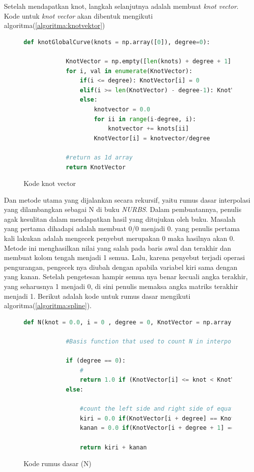 Setelah mendapatkan knot, langkah selanjutnya 
adalah membuat \textit{knot vector}. Kode untuk 
\textit{knot vector} akan dibentuk mengikuti 
algoritma(\ref{algoritma:knotvektor})
\begin{figure}[H]
	\centering
	\begin{lstlisting}[language=Python, basicstyle=\tiny]
		def knotGlobalCurve(knots = np.array([0]), degree=0):

			KnotVector = np.empty([len(knots) + degree + 1])
			for i, val in enumerate(KnotVector):
				if(i <= degree): KnotVector[i] = 0 
				elif(i >= len(KnotVector) - degree-1): KnotVector[i] = 1
				else:
					knotvector = 0.0
					for ii in range(i-degree, i):
						knotvector += knots[ii]
					KnotVector[i] = knotvector/degree

			#return as 1d array
			return KnotVector
	\end{lstlisting}
	\caption{Kode knot vector}
	\label{kode:knotvector}
\end{figure}

Dan metode utama yang dijalankan secara rekursif, 
yaitu rumus dasar interpolasi yang dilambangkan 
sebagai N di buku \textit{NURBS}. Dalam pembuatannya, 
penulis agak kesulitan dalam mendapatkan hasil yang 
ditujukan oleh buku. Masalah yang pertama dihadapi 
adalah membuat 0/0 menjadi 0. yang penulis pertama 
kali lakukan adalah mengecek penyebut merupakan 0 maka 
hasilnya akan 0. Metode ini menghasilkan nilai yang salah 
pada baris awal dan terakhir dan membuat kolom tengah 
menjadi 1 semua. Lalu, karena penyebut terjadi operasi 
pengurangan, pengecek nya diubah dengan apabila variabel 
kiri sama dengan yang kanan. Setelah pengetesan hampir 
semua nya benar kecuali angka terakhir, yang seharusnya 1 
menjadi 0, di sini penulis memaksa angka matriks terakhir 
menjadi 1. Berikut adalah kode untuk rumus dasar mengikuti
algoritma(\ref{algoritma:spline}).
\begin{figure}[H]
	\centering
	\begin{lstlisting}[language=Python, basicstyle=\tiny]
		def N(knot = 0.0, i = 0 , degree = 0, KnotVector = np.array([0])):

			#Basis function that used to count N in interpolation

			if (degree == 0):
				#
				return 1.0 if (KnotVector[i] <= knot < KnotVector[i + 1]) else 0.0
			else:
				
				#count the left side and right side of equation
				kiri = 0.0 if(KnotVector[i + degree] == KnotVector[i]) else (knot - KnotVector[i]) / (KnotVector[i + degree] - KnotVector[i]) * GlobalInterpolation.N(knot, i, degree - 1, KnotVector)
				kanan = 0.0 if(KnotVector[i + degree + 1] == KnotVector[i + 1]) else (KnotVector[i + degree + 1] - knot) / (KnotVector[i + degree + 1] - KnotVector[i + 1]) * GlobalInterpolation.N(knot, i + 1, degree - 1, KnotVector)
			
				return kiri + kanan
	\end{lstlisting}
	\caption{Kode rumus dasar (N)}
	\label{kode:rumusdasar}
\end{figure}

